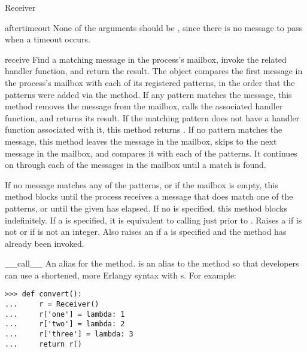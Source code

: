 \documentclass{howto}
\begin{document}
\begin{classdesc}{Receiver}{}
\begin{methoddesc}{after}{timeout}
None of the  arguments should be , since
there is no message to pass when a timeout occurs.
\end{methoddesc}

\begin{methoddesc}{receive}{}
Find a matching message in the process's mailbox, invoke the related handler
function, and return the result. The  object compares the first
message in the process's mailbox with each of its registered patterns, in the
order that the patterns were added via the  method. If any
pattern matches the message, this method removes the message from the mailbox,
calls the associated handler function, and returns its result. If the matching
pattern does not have a handler function associated with it, this method returns
. If no pattern matches the message, this method leaves the
message in the mailbox, skips to the next message in the mailbox, and compares
it with each of the patterns. It continues on through each of the messages in
the mailbox until a match is found.

If no message matches any of the patterns, or if the mailbox is empty, this
method blocks until the process receives a message that does match one of the
patterns, or until the given  has elapsed. If no  is
specified, this method blocks indefinitely. If a  is specified, it
is equivalent to calling 
just prior to . Raises a 
 if  is not  or if
 is not an integer. Also raises an  if a
 is specified and the  method has already been
invoked.
\end{methoddesc}

\begin{methoddesc}{__call__}{}
\opindex{()}
An alias for the  method.  is an alias to
the  method so that developers can use a shortened, more
Erlangy syntax with s. For example:
\begin{verbatim}
>>> def convert():
...     r = Receiver()
...     r['one'] = lambda: 1
...     r['two'] = lambda: 2
...     r['three'] = lambda: 3
...     return r()
\end{verbatim}
\end{methoddesc}


\end{classdesc}
\end{document}

